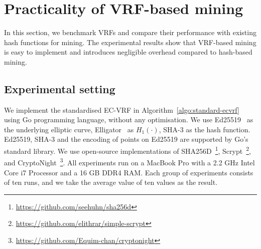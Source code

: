 \section{Practicality of VRF-based mining}
\label{sec:practicality}

In this section, we benchmark VRFs and compare their performance with existing hash functions for mining.
The experimental results show that VRF-based mining is easy to implement and introduces negligible overhead compared to hash-based mining.

\subsection{Experimental setting}

We implement the standardised EC-VRF in Algorithm~\ref{algo:standard-ecvrf} using Go programming language, without any optimisation.
We use Ed25519~\cite{bernstein2012high} as the underlying elliptic curve, Elligator~\cite{bernstein2013elligator} as $H_1(\cdot)$, SHA-3 as the hash function.
Ed25519, SHA-3 and the encoding of points on Ed25519 are supported by Go's standard library.
We use open-source implementations of SHA256D~\footnote{\url{https://github.com/seehuhn/sha256d}}, Scrypt~\footnote{\url{https://github.com/elithrar/simple-scrypt}}, and CryptoNight~\footnote{\url{https://github.com/Equim-chan/cryptonight}}.
All experiments run on a MacBook Pro with a 2.2 GHz Intel Core i7 Processor and a 16 GB DDR4 RAM.
Each group of experiments consists of ten runs, and we take the average value of ten values as the result.

